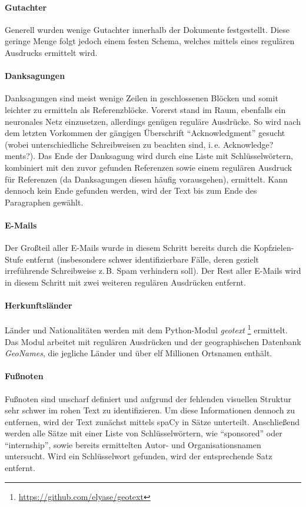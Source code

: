 \documentclass[bachelor,german]{info1thesis}
\begin{document}
\paragraph{Gutachter} Generell wurden wenige Gutachter innerhalb der Dokumente festgestellt. Diese geringe Menge folgt jedoch einem festen Schema, welches mittels eines regulären Ausdrucks ermittelt wird.
\paragraph{Danksagungen} Danksagungen sind meist wenige Zeilen in geschlossenen Blöcken und somit leichter zu ermitteln als Referenzblöcke. Vorerst stand im Raum, ebenfalls ein neuronales Netz einzusetzen, allerdings genügen reguläre Ausdrücke. So wird nach dem letzten Vorkommen der gängigen Überschrift ``Acknowledgment'' gesucht (wobei unterschiedliche Schreibweisen zu beachten sind, i.\,e. Acknowledge?ments?). Das Ende der Danksagung wird durch eine Liste mit Schlüsselwörtern, kombiniert mit den zuvor gefunden Referenzen sowie einem regulären Ausdruck für Referenzen (da Danksagungen diesen häufig vorausgehen), ermittelt. Kann dennoch kein Ende gefunden werden, wird der Text bis zum Ende des Paragraphen gewählt.
\paragraph{E-Mails} Der Großteil aller E-Mails wurde in diesem Schritt bereits durch die Kopfzielen-Stufe entfernt (insbesondere schwer identifizierbare Fälle, deren gezielt irreführende Schreibweise z.\,B. Spam verhindern soll). Der Rest aller E-Mails wird in diesem Schritt mit zwei weiteren regulären Ausdrücken entfernt.
\paragraph{Herkunftsländer} Länder und Nationalitäten werden mit dem Python-Modul \textit{geotext} \footnote{\url{https://github.com/elyase/geotext}} ermittelt. Das Modul arbeitet mit regulären Ausdrücken und der geographischen Datenbank \textit{GeoNames}, die jegliche Länder und über elf Millionen Ortsnamen enthält.
\paragraph{Fußnoten} Fußnoten sind unscharf definiert und aufgrund der fehlenden visuellen Struktur sehr schwer im rohen Text zu identifizieren. Um diese Informationen dennoch zu entfernen, wird der Text zunächst mittels spaCy in Sätze unterteilt. Anschließend werden alle Sätze mit einer Liste von Schlüsselwörtern, wie ``sponsored'' oder ``internship'', sowie bereits ermittelten Autor- und Organisationsnamen untersucht. Wird ein Schlüsselwort gefunden, wird der entsprechende Satz entfernt.
\end{document}

